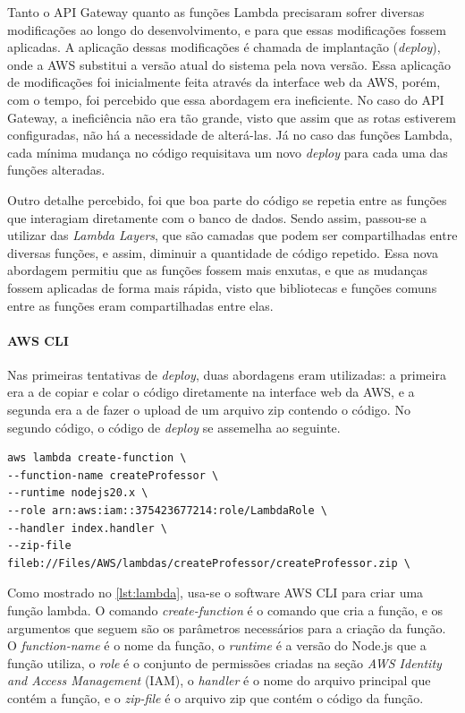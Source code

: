 Tanto o API Gateway quanto as funções Lambda precisaram sofrer diversas modificações ao longo do desenvolvimento, e para que essas modificações fossem aplicadas. A aplicação dessas modificações é chamada de implantação (\textit{deploy}), onde a AWS substitui a versão atual do sistema pela nova versão. Essa aplicação de modificações foi inicialmente feita através da interface web da AWS, porém, com o tempo, foi percebido que essa abordagem era ineficiente. No caso do API Gateway, a ineficiência não era tão grande, visto que assim que as rotas estiverem configuradas, não há a necessidade de alterá-las. Já no caso das funções Lambda, cada mínima mudança no código requisitava um novo \textit{deploy} para cada uma das funções alteradas.

Outro detalhe percebido, foi que boa parte do código se repetia entre as funções que interagiam diretamente com o banco de dados. Sendo assim, passou-se a utilizar das \textit{Lambda Layers}, que são camadas que podem ser compartilhadas entre diversas funções, e assim, diminuir a quantidade de código repetido. Essa nova abordagem permitiu que as funções fossem mais enxutas, e que as mudanças fossem aplicadas de forma mais rápida, visto que bibliotecas e funções comuns entre as funções eram compartilhadas entre elas.

\paragraph*{AWS CLI}

Nas primeiras tentativas de \textit{deploy}, duas abordagens eram utilizadas: a primeira era a de copiar e colar o código diretamente na interface web da AWS, e a segunda era a de fazer o upload de um arquivo zip contendo o código. No segundo código, o código de \textit{deploy} se assemelha ao seguinte.

\begin{lstlisting}[caption={Código de \textit{deploy} de Lambda}, label={lst:lambda}]
aws lambda create-function \
--function-name createProfessor \
--runtime nodejs20.x \
--role arn:aws:iam::375423677214:role/LambdaRole \
--handler index.handler \
--zip-file fileb://Files/AWS/lambdas/createProfessor/createProfessor.zip \
\end{lstlisting}

Como mostrado no \autoref{lst:lambda}, usa-se o software AWS CLI para criar uma função lambda. O comando \textit{create-function} é o comando que cria a função, e os argumentos que seguem são os parâmetros necessários para a criação da função. O \textit{function-name} é o nome da função, o \textit{runtime} é a versão do Node.js que a função utiliza, o \textit{role} é o conjunto de permissões criadas na seção \textit{AWS Identity and Access Management} (IAM), o \textit{handler} é o nome do arquivo principal que contém a função, e o \textit{zip-file} é o arquivo zip que contém o código da função.

